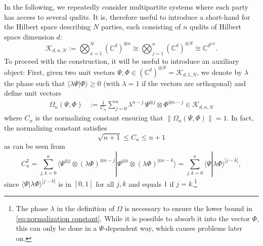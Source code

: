 \documentclass[a4paper, 10pt, onecolumn, accepted=2025-07-22]{quantumarticle}
\theoremstyle{definition}
\newcommand{\ip}[2]{\langle #1|#2\rangle}
\newcommand{\norm}[1]{\lVert #1\rVert}
\newcommand{\ox}{\otimes}
\def\CC{{\mathbb C}}
\def\K{{\mathcal K}}
\newcommand*{\1}{\text{\usefont{U}{bbold}{m}{n}1}}
\begin{document}
In the following, we repeatedly consider multipartite systems where each party has access to several qudits. It is, therefore useful to introduce a short-hand for the Hilbert space describing $N$ parties, each consisting of $n$ qudits of Hilbert space dimension $d$:
\begin{equation}
    \K_{d,n,N}:= \bigotimes_{x=1}^N (\CC^d)^{\otimes n} \cong \bigotimes_{j=1}^{n} (\CC^d)^{\otimes N}\cong \CC^{d^{nN}}.
\end{equation}
To proceed with the construction, it will be useful to introduce an auxiliary object: First, given two unit vectors $\Psi,\Phi\in (\CC^d)^{\ox N}=\K_{d,1,N}$, we denote by $\lambda$ the phase such that $\ip{\lambda\Psi}{\Phi}\ge0$ (with $\lambda=1$ if the vectors are orthogonal) and define unit vectors
\begin{align}
    \Omega_n(\Psi,\Phi) & := \frac{1}{C_n}\sum_{j=0}^{n} \lambda^{n-j}\,
    {\Psi}^{\otimes j}\otimes {\Phi}^{\otimes n-j} \in \K_{d,n,N}
\end{align}
where $C_n$ is the normalizing constant ensuring that $\norm{\Omega_n(\Psi,\Phi)}=1$.
In fact, the normalizing constant satisfies 
\begin{equation}\label{eq:normalization constant}
    \sqrt{n+1}\le C_n \le n+1
\end{equation}
as can be seen from 
\begin{equation*}
    C_n^2 = \sum_{j,k=0}^{n} \langle\Psi^{\ox j}\ox (\lambda\Phi)^{\ox n-j}|\Psi^{\ox k}\ox (\lambda\Phi)^{\ox n-k}\rangle = \sum_{j,k=0}^{n} \langle\Psi|\lambda\Phi\rangle^{|j-k|},
\end{equation*}
since $\ip\Psi{\lambda\Phi}^{|j-k|}$ is in $[0,1]$ for all $j,k$ and equals $1$ if $j=k$.\footnote{The phase $\lambda$ in the definition of $\Omega$ is necessary to ensure the lower bound in \eqref{eq:normalization constant}. While it is possible to absorb it into the vector $\Phi$, this can only be done in a $\Psi$-dependent way, which causes problems later on.}
\end{document}
